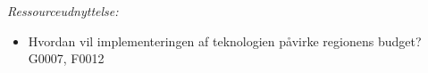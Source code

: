 \textit{Ressourceudnyttelse:}
\begin{itemize}
	\item Hvordan vil implementeringen af teknologien påvirke regionens budget? G0007, F0012
\end{itemize}
%
%
